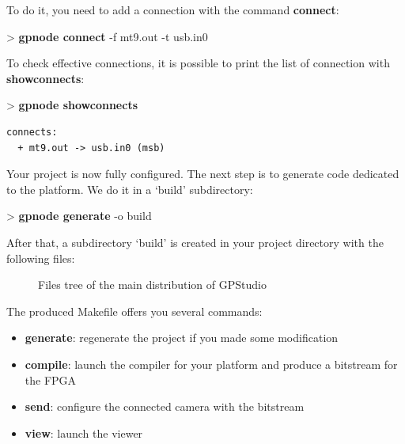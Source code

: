 \documentclass[10pt,a4paper]{article}
\begin{document}
To do it, you need to add a connection with the command \textbf{connect}:
\begin{sample}
> \textbf{gpnode connect} -f mt9.out -t usb.in0
\end{sample}

To check effective connections, it is possible to print the list of connection with \textbf{showconnects}:
\begin{sample}
> \textbf{gpnode showconnects}
\begin{Verbatim}
connects:
  + mt9.out -> usb.in0 (msb)
\end{Verbatim}
\end{sample}

Your project is now fully configured. The next step is to generate code dedicated to the platform. We do it in a `build' subdirectory:

\begin{sample}
> \textbf{gpnode generate} -o build
\end{sample}

After that, a subdirectory `build' is created in your project directory with the following files:

\begin{figure}[h]
\caption{Files tree of the main distribution of GPStudio}
\label{fig:archivetree}
\end{figure}

The produced Makefile offers you several commands:
\begin{itemize}
\item \textbf{generate}: regenerate the project if you made some modification
\item \textbf{compile}: launch the compiler for your platform and produce a bitstream for the FPGA
\item \textbf{send}: configure the connected camera with the bitstream
\item \textbf{view}: launch the viewer
\end{itemize}
\end{document}

